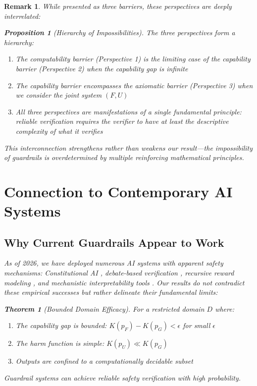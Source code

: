 \documentclass[11pt]{article}
\newtheorem{theorem}{Theorem}
\newtheorem{remark}{Remark}
\newtheorem{proposition}{Proposition}
\begin{document}
\begin{remark}
While presented as three barriers, these perspectives are deeply interrelated:

\begin{proposition}[Hierarchy of Impossibilities]
The three perspectives form a hierarchy:
\begin{enumerate}
\item The computability barrier (Perspective 1) is the limiting case of the capability barrier (Perspective 2) when the capability gap is infinite
\item The capability barrier encompasses the axiomatic barrier (Perspective 3) when we consider the joint system $(F, U)$
\item All three perspectives are manifestations of a single fundamental principle: reliable verification requires the verifier to have at least the descriptive complexity of what it verifies
\end{enumerate}
\end{proposition}

This interconnection strengthens rather than weakens our result—the impossibility of guardrails is overdetermined by multiple reinforcing mathematical principles.

\section{Connection to Contemporary AI Systems}

\subsection{Why Current Guardrails Appear to Work}

As of 2026, we have deployed numerous AI systems with apparent safety mechanisms: Constitutional AI \cite{amodei2023constitutional}, debate-based verification \cite{irving2018debate}, recursive reward modeling \cite{leike2018recursive}, and mechanistic interpretability tools \cite{olah2020zoom}. Our results do not contradict these empirical successes but rather delineate their fundamental limits:

\begin{theorem}[Bounded Domain Efficacy]
For a restricted domain $D$ where:
\begin{enumerate}
\item The capability gap is bounded: $K(p_F) - K(p_G) < \epsilon$ for small $\epsilon$
\item The harm function is simple: $K(p_U) \ll K(p_G)$  
\item Outputs are confined to a computationally decidable subset
\end{enumerate}
Guardrail systems can achieve reliable safety verification with high probability.
\end{theorem}


\end{remark}
\end{document}
